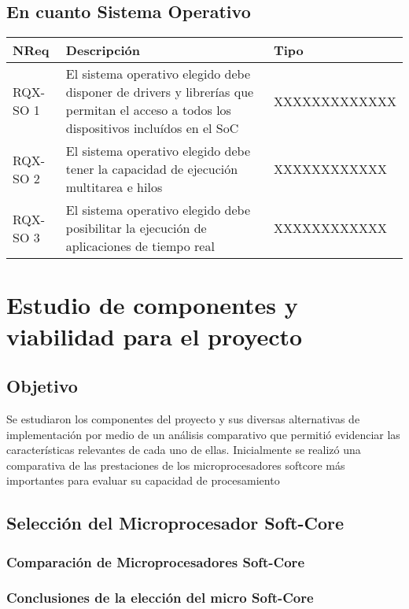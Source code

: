 		\subsection{En cuanto Sistema Operativo} 	 
		\begin{tabular}{ p{2.5cm} p{8cm} p{3cm} }
		\hline 
		\rowcolor[gray]{0.8} N\textordmasculine Req & Descripción  & Tipo\\
		\hline 
		RQX-SO 1 &  El sistema operativo elegido debe disponer de drivers y librerías que permitan el acceso a todos los dispositivos incluídos en el SoC &
		XXXXXXXXXXXXX\\ %
		\hline 
		RQX-SO 2 &  El sistema operativo elegido debe tener la capacidad de ejecución multitarea e hilos & XXXXXXXXXXXX\\ %
		\hline
		RQX-SO 3 &  El sistema operativo elegido debe posibilitar la ejecución de aplicaciones de tiempo real & XXXXXXXXXXXX\\ %
		\hline 
		\end{tabular}
		
	
	\section{Estudio de componentes y viabilidad para el proyecto}
		
			\subsection{Objetivo}
			Se estudiaron los componentes del proyecto y sus diversas alternativas de implementación por medio de un análisis comparativo que permitió evidenciar
			las características relevantes de cada uno de ellas. Inicialmente se realizó una comparativa de las prestaciones de los microprocesadores softcore
			más importantes para evaluar su capacidad de procesamiento 
			
			\subsection{Selección del Microprocesador Soft-Core}
			
				\subsubsection{Comparación de Microprocesadores Soft-Core} 
	
				\subsubsection{Conclusiones de la elección del micro Soft-Core}
 			
